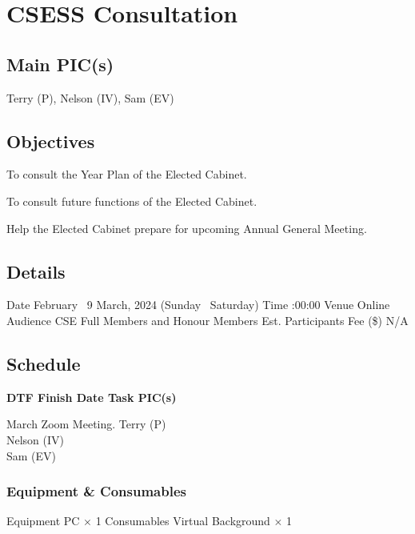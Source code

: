 \section{CSESS Consultation}

\subsection{Main PIC(s)}
Terry (P), Nelson (IV), Sam (EV)

\subsection{Objectives}
\startitemize
\item To consult the Year Plan of the Elected Cabinet.
\item To consult future functions of the Elected Cabinet.
\item Help the Elected Cabinet prepare for upcoming Annual General Meeting.
\stopitemize

\subsection{Details}
\starttabulate[|rB|l|]
\NC Date
 February \endash\ 9 March, 2024 (Sunday \endash\ Saturday) \NR
\NC Time
:00:00 \NR
\NC Venue
\NC Online \NR
\NC Audience
\NC CSE Full Members and Honour Members \NR
\NC Est. Participants
 \NR
\NC Fee (\$)
\NC N/A \NR
\stoptabulate

\subsection{Schedule}

\setupTABLE[c][1][width=0.75in]
\setupTABLE[c][2][width=1in]
\setupTABLE[c][3][width=3in]
\setupTABLE[c][4][width=1.25in]
\bTABLE
\bTABLEhead

\bTR\bTH    \bf{DTF}
\eTH\bTH    \bf{Finish Date}
\eTH\bTH    \bf{Task}
\eTH\bTH    \bf{PIC(s)}
\eTH\eTR

\eTABLEhead
\bTABLEbody

\bTR{}
\eTD{} March
\eTD\bTD Zoom Meeting.
\eTD\bTD Terry (P) \\ Nelson (IV) \\ Sam (EV)
\eTD\eTR

\eTABLEbody
\eTABLE

\subsubsection{Equipment \& Consumables}
\starttabulate[|l|l|]
\NC{}Equipment\NC\NR
\HL
\NC PC \NC $\times$ 1 \NR
\HL
\NR
\NC{}Consumables\NC\NR
\HL
\NC Virtual Background \NC $\times$ 1 \NR
\HL
\stoptabulate

